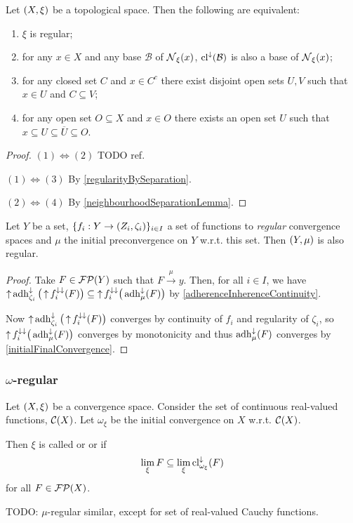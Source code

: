 \begin{proposition} \label{topologicalRegularity}
Let $\sSet{X,\xi}$ be a topological space. Then the following are equivalent:
\begin{enumerate}
\item $\xi$ is regular;
\item for any $x\in X$ and any base $\mathcal{B}$ of $\operatorname{\mathcal{N}}_\xi(x)$, $\operatorname{cl}^\downarrow(\mathcal{B})$ is also a base of $\operatorname{\mathcal{N}}_\xi(x)$;
\item for any closed set $C$ and $x\in C^c$ there exist disjoint open sets $U,V$ such that $x\in U$ and $C\subseteq V$;
\item for any open set $O\subseteq X$ and $x\in O$ there exists an open set $U$ such that $x\subseteq U\subseteq \overline{U} \subseteq O$.
\end{enumerate}
\end{proposition}
\begin{proof}
$(1) \Leftrightarrow (2)$ TODO ref.

$(1) \Leftrightarrow (3)$ By \ref{regularityBySeparation}.

$(2) \Leftrightarrow (4)$ By \ref{neighbourhoodSeparationLemma}.
\end{proof}

\begin{proposition} \label{regularityInitialConvergence}
Let $Y$ be a set, $\{f_i: Y\to \sSet{Z_i, \zeta_i}\}_{i\in I}$ a set of functions to \emph{regular} convergence spaces and $\mu$ the initial preconvergence on $Y$ w.r.t. this set. Then $\sSet{Y,\mu}$ is also regular.
\end{proposition}
\begin{proof}
Take $F\in \operatorname{\mathcal{FP}}(Y)$ such that $F\overset{\mu}{\longrightarrow} y$. Then, for all $i\in I$, we have $\operatorname{\uparrow}\operatorname{adh}_{\zeta_i}^\downarrow\big(\operatorname{\uparrow} f_i^{\downarrow\downarrow}(F)\big)\subseteq \operatorname{\uparrow} f_i^{\downarrow\downarrow}\big(\operatorname{adh}_{\mu}^{\downarrow}(F)\big)$ by \ref{adherenceInherenceContinuity}.

Now $\operatorname{\uparrow}\operatorname{adh}_{\zeta_i}^\downarrow\big(\operatorname{\uparrow} f_i^{\downarrow\downarrow}(F)\big)$ converges by continuity of $f_i$ and regularity of $\zeta_i$, so $\operatorname{\uparrow} f_i^{\downarrow\downarrow}\big(\operatorname{adh}_{\mu}^{\downarrow}(F)\big)$ converges by monotonicity and thus $\operatorname{adh}_{\mu}^{\downarrow}(F)$ converges by \ref{initialFinalConvergence}.
\end{proof}

\subsubsection{$\omega$-regular}
\begin{definition}
Let $\sSet{X,\xi}$ be a convergence space. Consider the set of continuous real-valued functions, $\operatorname{\mathcal{C}}(X)$. Let $\omega_\xi$ be the initial convergence on $X$ w.r.t. $\operatorname{\mathcal{C}}(X)$.

Then $\xi$ is called  or  or  if
\[ \lim_\xi F \subseteq \lim_\xi \operatorname{cl}_{\omega_\xi}^\downarrow(F) \]
for all $F\in \operatorname{\mathcal{FP}}(X)$.
\end{definition}
TODO: $\mu$-regular similar, except for set of real-valued Cauchy functions.

